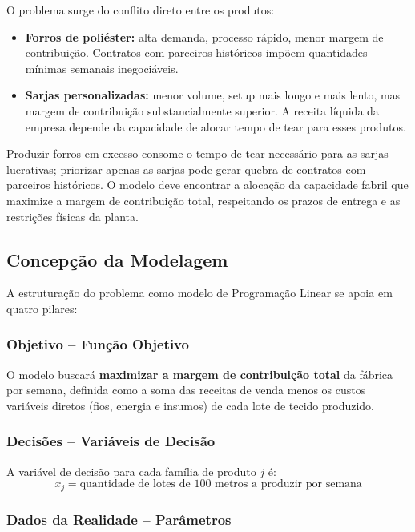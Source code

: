 O problema surge do conflito direto entre os produtos:

\begin{itemize}
  \item \textbf{Forros de poliéster:} alta demanda, processo rápido, menor margem
        de contribuição. Contratos com parceiros históricos impõem quantidades
        mínimas semanais inegociáveis.

  \item \textbf{Sarjas personalizadas:} menor volume, setup mais longo e mais lento,
        mas margem de contribuição substancialmente superior. A receita líquida da
        empresa depende da capacidade de alocar tempo de tear para esses produtos.
\end{itemize}

Produzir forros em excesso consome o tempo de tear necessário para as sarjas
lucrativas; priorizar apenas as sarjas pode gerar quebra de contratos com
parceiros históricos. O modelo deve encontrar a alocação da capacidade fabril
que maximize a margem de contribuição total, respeitando os prazos de entrega
e as restrições físicas da planta.

\subsection{Concepção da Modelagem}

A estruturação do problema como modelo de Programação Linear se apoia em
quatro pilares:

\subsubsection{Objetivo -- Função Objetivo}

O modelo buscará \textbf{maximizar a margem de contribuição total} da fábrica
por semana, definida como a soma das receitas de venda menos os custos
variáveis diretos (fios, energia e insumos) de cada lote de tecido produzido.

\subsubsection{Decisões -- Variáveis de Decisão}

A variável de decisão para cada família de produto $j$ é:
\[
  x_j = \text{quantidade de lotes de 100 metros a produzir por semana}
\]

\subsubsection{Dados da Realidade -- Parâmetros}

